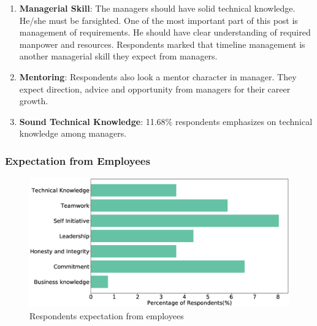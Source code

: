 \begin{enumerate}
    
    \item\textbf{Managerial Skill}: The managers should have solid technical knowledge. He/she must be farsighted. One of the most important part of this post is management of requirements. He should have clear  understanding of required manpower and resources. Respondents marked that timeline management is another managerial skill they expect from managers.
    
    
    \item \textbf{Mentoring}: Respondents also look  a mentor character in manager. They expect direction, advice and opportunity from managers for their career growth.
    
    
    \item\textbf{Sound Technical Knowledge}: 11.68\% respondents emphasizes on technical knowledge among managers.

\end{enumerate}


\subsubsection{Expectation from Employees}
\label{Expectation from Employees}
\begin{figure}[htbp]
\includegraphics[scale=0.28]{Figures/EmployeeExpectation.eps} 
\caption{Respondents expectation from employees}
\label{fig:employees expectation}
\end{figure}


